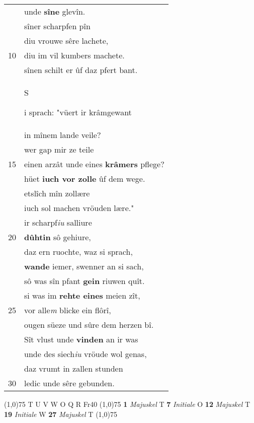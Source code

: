 \documentclass[8pt,a4paper,notitlepage]{article}
\begin{document}
\begin{table}[ht]
\begin{minipage}[t]{0.5\linewidth}
\begin{tabular}{rl}
 & unde \textbf{sîne} glevîn.\\ 
 & sîner scharpfen pîn\\ 
 & diu vrouwe sêre lachete,\\ 
10 & diu im vil kumbers machete.\\ 
 & sînen schilt er ûf daz pfert bant.\\ 
 & \begin{large}S\end{large}i sprach: "vüert ir krâmgewant\\ 
 & in mînem lande veile?\\ 
 & wer gap mir ze teile\\ 
15 & einen arzât unde eines \textbf{krâmers} pflege?\\ 
 & hüet \textbf{iuch vor zolle} ûf dem wege.\\ 
 & etslîch mîn zollære\\ 
 & iuch sol machen vröuden lære."\\ 
 & ir scharpf\textit{iu} salliure\\ 
20 & \textbf{dûhtin} sô gehiure,\\ 
 & daz ern ruochte, waz si sprach,\\ 
 & \textbf{wande} iemer, swenner an si sach,\\ 
 & sô was sîn pfant \textbf{gein} riuwen quît.\\ 
 & si was im \textbf{rehte eines} meien zît,\\ 
25 & vor alle\textit{m} blicke ein flôrî,\\ 
 & ougen süeze und sûre dem herzen bî.\\ 
 & Sît vlust unde \textbf{vinden} an ir was\\ 
 & unde des siech\textit{iu} vröude wol genas,\\ 
 & daz vrumt in zallen stunden\\ 
30 & ledic unde sêre gebunden.\\ 
\end{tabular}
\scriptsize
\line(1,0){75} \newline
T U V W O Q R Fr40 \newline
\line(1,0){75} \newline
\textbf{1} \textit{Majuskel} T  \textbf{7} \textit{Initiale} O  \textbf{12} \textit{Majuskel} T  \textbf{19} \textit{Initiale} W  \textbf{27} \textit{Majuskel} T  \newline
\line(1,0){75} \newline

\end{minipage}
\end{table}
\end{document}
